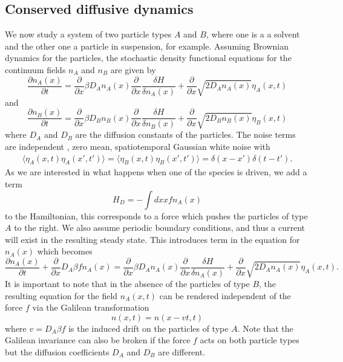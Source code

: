     \subsection{Conserved diffusive dynamics}
We now study a system of two particle types $A$ and $B$, where one is a a solvent and the other one a particle in suspension, for example.
Assuming Brownian dynamics for the particles, the stochastic density functional equations for the continuum fields $n_A$ and $n_B$ are
given by
\begin{equation}
\frac{\partial n_A(x)}{\partial t} = \frac{\partial}{\partial x} \beta D_A n_A(x)\frac{\partial}{\partial x} \frac{\delta H}{\delta n_A(x)} + \frac{\partial}{\partial x} \sqrt{2D_A n_A(x)} \eta_A(x,t)
\end{equation}
and 
\begin{equation}
\frac{\partial n_B(x)}{\partial t} = \frac{\partial}{\partial x} \beta D_B n_B(x)\frac{\partial}{\partial x} \frac{\delta H}{\delta n_B(x)} + \frac{\partial}{\partial x} \sqrt{2D_Bn_B(x)} \eta_B(x,t)
\end{equation}
where $D_A$ and $D_B$ are the diffusion constants of the particles. The noise terms are independent , zero mean, spatiotemporal Gaussian white noise with
\begin{eqnarray}
\langle \eta_A(x,t) \eta_A(x',t')\rangle = \langle \eta_B(x,t) \eta_B(x',t')\rangle =\delta(x-x')\delta(t-t').
\end{eqnarray}
As we are interested in what happens when one of the species is driven, we add a term
\begin{equation}
H_D = -\int dx xf n_A(x)
\end{equation}
to the Hamiltonian, this corresponds to a force which pushes the particles of type $A$ to the right. We also assume periodic boundary conditions, and thus a current will exist in the resulting steady state.
This introduces term in the equation for $n_A(x)$ which becomes
\begin{equation}
\frac{\partial n_A(x)}{\partial t}+ \frac{\partial}{\partial x}D_A\beta f n_A(x) = \frac{\partial}{\partial x} \beta D_A n_A(x)\frac{\partial}{\partial x} \frac{\delta H}{\delta n_A(x)} + \frac{\partial}{\partial x} \sqrt{2D_A n_A(x)} \eta_A(x,t).
\end{equation}
It is important to note that in the absence of the particles of type $B$, the resulting equation for the field $n_A(x,t)$ can be rendered independent of
the force $f$ via the Galilean transformation
\begin{equation}
n(x,t) = n(x-vt,t)
\end{equation}
where $v= D_A\beta f$ is the induced drift on the particles of type $A$.
Note that the Galilean invariance can also be broken if the force $f$ acts on both particle types but the diffusion coefficients $D_A$ and $D_B$ are different.

